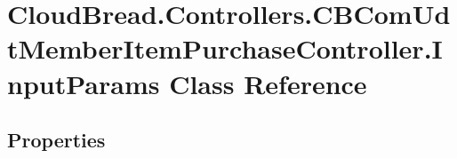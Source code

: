 \hypertarget{class_cloud_bread_1_1_controllers_1_1_c_b_com_udt_member_item_purchase_controller_1_1_input_params}{}\section{Cloud\+Bread.\+Controllers.\+C\+B\+Com\+Udt\+Member\+Item\+Purchase\+Controller.\+Input\+Params Class Reference}
\label{class_cloud_bread_1_1_controllers_1_1_c_b_com_udt_member_item_purchase_controller_1_1_input_params}
\subsection*{Properties}
